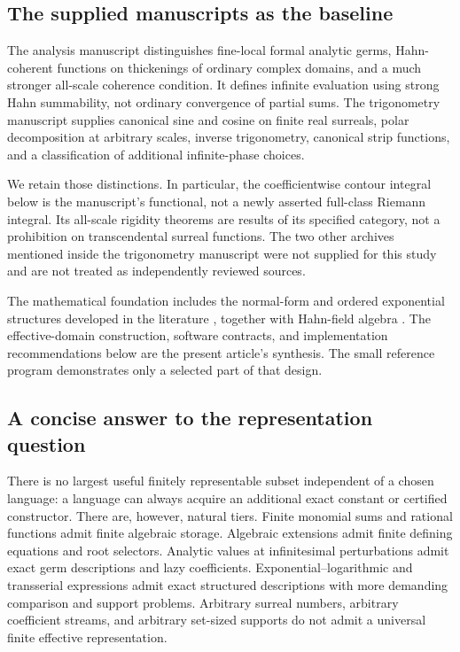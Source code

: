 \documentclass[11pt,letterpaper]{article}
\theoremstyle{definition}
\numberwithin{equation}{section}
\begin{document}
\subsection{The supplied manuscripts as the baseline}
The analysis manuscript \cite{SourceAnalysis} distinguishes fine-local formal analytic germs, Hahn-coherent functions on thickenings of ordinary complex domains, and a much stronger all-scale coherence condition. It defines infinite evaluation using strong Hahn summability, not ordinary convergence of partial sums. The trigonometry manuscript \cite{SourceTrig} supplies canonical sine and cosine on finite real surreals, polar decomposition at arbitrary scales, inverse trigonometry, canonical strip functions, and a classification of additional infinite-phase choices.

We retain those distinctions. In particular, the coefficientwise contour integral below is the manuscript's functional, not a newly asserted full-class Riemann integral. Its all-scale rigidity theorems are results of its specified category, not a prohibition on transcendental surreal functions. The two other archives mentioned inside the trigonometry manuscript were not supplied for this study and are not treated as independently reviewed sources.

The mathematical foundation includes the normal-form and ordered exponential structures developed in the literature \cite{Conway,Gonshor,vdDE}, together with Hahn-field algebra \cite{Poonen}. The effective-domain construction, software contracts, and implementation recommendations below are the present article's synthesis. The small reference program demonstrates only a selected part of that design.

\subsection{A concise answer to the representation question}
There is no largest useful finitely representable subset independent of a chosen language: a language can always acquire an additional exact constant or certified constructor. There are, however, natural tiers. Finite monomial sums and rational functions admit finite algebraic storage. Algebraic extensions admit finite defining equations and root selectors. Analytic values at infinitesimal perturbations admit exact germ descriptions and lazy coefficients. Exponential--logarithmic and transserial expressions admit exact structured descriptions with more demanding comparison and support problems. Arbitrary surreal numbers, arbitrary coefficient streams, and arbitrary set-sized supports do not admit a universal finite effective representation.
\end{document}
